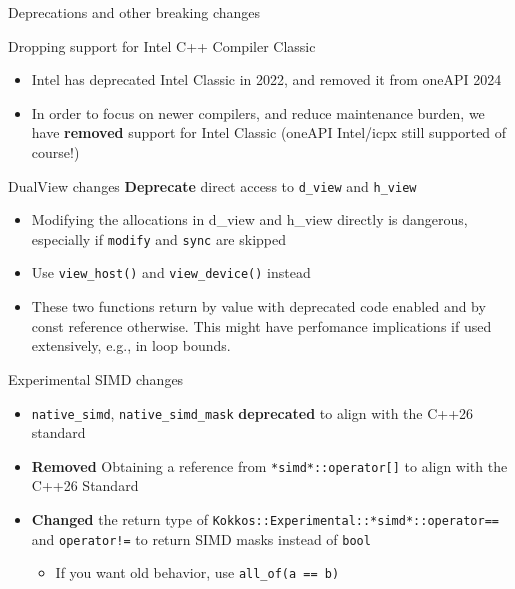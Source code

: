
\begin{frame}[fragile]

  {\Huge Deprecations and other breaking changes}

  \vspace{10pt}

\end{frame}


\begin{frame}[fragile]{Dropping support for Intel C++ Compiler Classic}
  \begin{itemize}
    \item Intel has deprecated Intel Classic in 2022, and removed it from oneAPI 2024
    \item In order to focus on newer compilers, and reduce maintenance burden, we have \textbf{removed} support for Intel Classic (oneAPI Intel/icpx still supported of course!)
  \end{itemize}
\end{frame}


\begin{frame}[fragile]{DualView changes}
  \textbf{Deprecate} direct access to \texttt{d\_view} and \texttt{h\_view}
  \begin{itemize}
    \item Modifying the allocations in d\_view and h\_view directly is dangerous, especially if \texttt{modify} and \texttt{sync} are skipped
    \item Use \texttt{view\_host()} and \texttt{view\_device()} instead
    \item These two functions return by value with deprecated code enabled and by const reference otherwise. This might have perfomance implications if used extensively, e.g., in loop bounds.
  \end{itemize}
\end{frame}


\begin{frame}[fragile]{Experimental SIMD changes}
  \begin{itemize}
    \item \texttt{native\_simd}, \texttt{native\_simd\_mask} \textbf{deprecated} to align with the C++26 standard
    \item \textbf{Removed} Obtaining a reference from \texttt{*simd*::operator[]} to align with the C++26 Standard
    \item \textbf{Changed} the return type of \texttt{Kokkos::Experimental::*simd*::operator==} and \texttt{operator!=} to return SIMD masks instead of \texttt{bool}
    \begin{itemize}
      \item If you want old behavior, use \texttt{all\_of(a == b)}
    \end{itemize}
  \end{itemize}
\end{frame}

